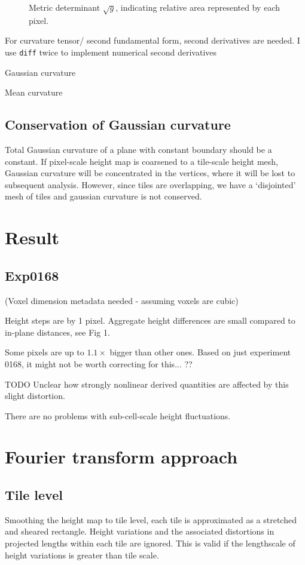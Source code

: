\documentclass[10pt,a4paper]{article}
\begin{document}
\begin{figure}
\caption{Metric determinant $\sqrt{g}$, indicating relative area represented by each pixel.}
\end{figure}

For curvature tensor/ second fundamental form, second derivatives are needed.  I use \texttt{diff} twice to implement numerical second derivatives

Gaussian curvature

Mean curvature
\subsection{Conservation of Gaussian curvature}
Total Gaussian curvature of a plane with constant boundary should be a constant.  If pixel-scale height map is coarsened to a tile-scale height mesh, Gaussian curvature will be concentrated in the vertices, where it will be lost to subsequent analysis.  However, since tiles are overlapping, we have a `disjointed' mesh of tiles and gaussian curvature is not conserved.
\section{Result}
\subsection{Exp0168}
(Voxel dimension metadata needed - assuming voxels are cubic)

Height steps are by 1 pixel.  Aggregate height differences are small compared to in-plane distances, see Fig 1.

Some pixels are up to $1.1 \times$ bigger than other ones.  Based on just experiment 0168, it might not be worth correcting for this... ??  

TODO Unclear how strongly nonlinear derived quantities are affected by this slight distortion.

There are no problems with sub-cell-scale height fluctuations.

\section{Fourier transform approach}
\subsection{Tile level}
Smoothing the height map to tile level, each tile is approximated as a stretched and sheared rectangle.  Height variations and the associated distortions in projected lengths within each tile are ignored.  This is valid if the lengthscale of height variations is greater than tile scale.  
\end{document}
